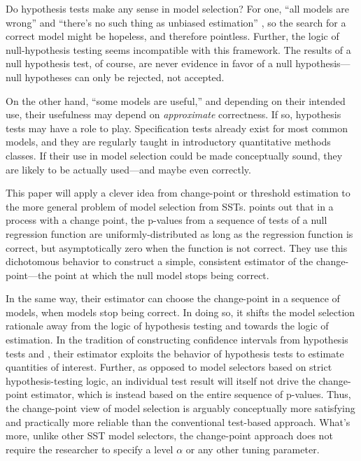 \documentclass[sts]{imsart}\usepackage[]{graphicx}\usepackage[]{color}
\begin{document}
Do hypothesis tests make any sense in model selection?
For one, ``all models are wrong''
\citep[p. 2]{modelsWrong} and ``there's no such thing as unbiased
estimation'' \citep{gelmanBlogUnbiased}, so the search for a correct
model might be hopeless, and therefore pointless.
Further, the logic of null-hypothesis testing seems incompatible
with this framework.
The results of a null hypothesis test, of course, are never evidence
in favor of a null hypothesis---null hypotheses can only be rejected,
not accepted.

On the other hand, ``some models are useful,'' and depending on their
intended use, their usefulness may depend on \emph{approximate}
correctness.
If so, hypothesis tests may have a role to play.
Specification tests already exist for most common models, and
they are regularly taught in introductory quantitative methods
classes.
If their use in model selection could be made conceptually sound, they
are likely to be actually used---and maybe even correctly.

This paper will apply a clever idea from change-point or threshold
estimation to the more general problem of model selection from SSTs.
\citet{mallik} points out that in a process with a change point,
the p-values from a sequence of tests of a null regression function
are uniformly-distributed as long as the regression function is
correct, but asymptotically zero when the function is not correct.
They use this dichotomous behavior to construct a simple, consistent
estimator of the change-point---the point at which the null model
stops being correct.

In the same way, their estimator can choose the change-point in
a sequence of models, when models stop being correct.
In doing so, it shifts the model selection rationale away
from the logic of hypothesis testing and towards the logic of
estimation.
In the tradition of constructing confidence intervals from hypothesis
tests and \citet{hodgeslehmann}, their estimator exploits
the behavior of hypothesis tests to estimate quantities of interest.
Further, as opposed to model selectors based on strict
hypothesis-testing logic, an individual test result will itself not
drive the change-point estimator, which is instead based on the entire
sequence of p-values.
Thus, the change-point view of model selection is arguably conceptually
more satisfying and practically more reliable than the conventional
test-based approach.
What's more, unlike other SST model selectors, the change-point
approach does not require the researcher to specify a level $\alpha$
or any other tuning parameter.
\end{document}
